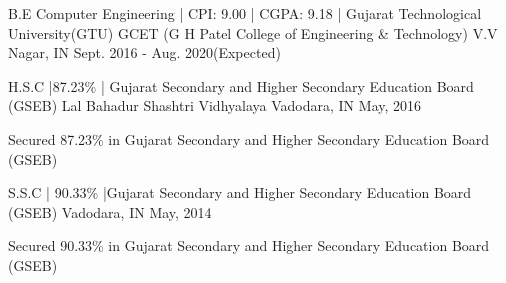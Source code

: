 

\begin{cventries}

  \cvent
    {B.E Computer Engineering | CPI: 9.00 | CGPA: 9.18 | Gujarat Technological University(GTU)} %
    {GCET (G H Patel College of Engineering \& Technology)} %
    {V{.}V Nagar, IN} %
    {Sept. 2016 - Aug. 2020(Expected)} %
    {
    }

\cvent
{H.S.C |87.23\% | Gujarat Secondary and Higher Secondary Education Board  (GSEB)} %
{Lal Bahadur Shashtri Vidhyalaya} %
{Vadodara, IN} %
{May, 2016} %
{ %
\begin{cvitems}
\item {Secured 87.23\% in Gujarat Secondary and Higher Secondary Education Board  (GSEB)}
\end{cvitems}
}
\cvsmallentry
{S.S.C | 90.33\% |Gujarat Secondary and Higher Secondary Education Board  (GSEB)} %
{}
{Vadodara, IN} %
{May, 2014} %
{ %
\begin{cvitems}
\item {Secured 90.33\% in Gujarat Secondary and Higher Secondary Education Board  (GSEB)}
\end{cvitems}
}

\end{cventries}

